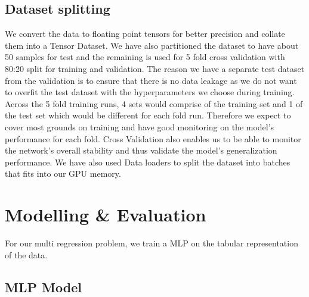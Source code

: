 \documentclass{report} %
\begin{document}
\section{Dataset splitting}\label{sec:Dataset splitting}
We convert the data to floating point tensors for better precision and collate them into a Tensor Dataset.
We have also partitioned the dataset to have about 50 samples for test and the remaining is used for 5 fold cross validation with 80:20 split for training and validation. 
The reason we have a separate test dataset from the validation is to ensure that there is no data leakage as we do not want to 
overfit the test dataset with the hyperparameters we choose during training. 
Across the 5 fold training runs, 4 sets would comprise of the training set and 1 of the test set which would be different for each fold run.
Therefore we expect to cover most grounds on training and have good monitoring on the model's performance for each fold.
Cross Validation also enables us to be able to monitor the network's overall stability and thus validate the model's generalization performance.
We have also used Data loaders to split the dataset into batches that fits into our \ac{GPU} memory.

\chapter{Modelling \& Evaluation}

For our multi regression problem, we train a \ac{MLP} on the tabular representation of the data.

\section{\ac{MLP} Model}\label{sec:MLP Model}


\end{document}
